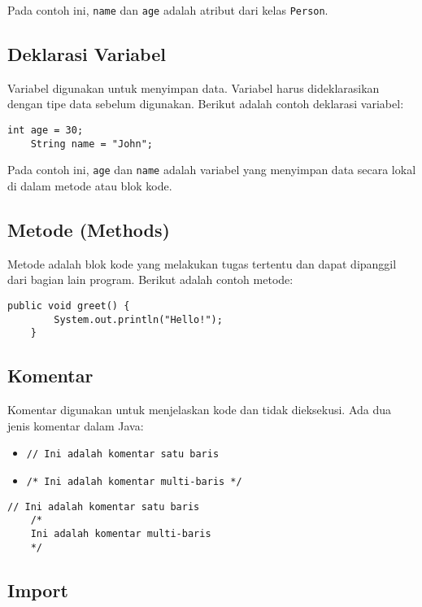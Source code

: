 Pada contoh ini, \texttt{name} dan \texttt{age} adalah atribut dari kelas \texttt{Person}.

\subsection{Deklarasi Variabel}
Variabel digunakan untuk menyimpan data. Variabel harus dideklarasikan dengan tipe data sebelum digunakan. Berikut adalah contoh deklarasi variabel:

\begin{lstlisting}[style=JavaStyle]
	int age = 30;
	String name = "John";
\end{lstlisting}

Pada contoh ini, \texttt{age} dan \texttt{name} adalah variabel yang menyimpan data secara lokal di dalam metode atau blok kode.


\subsection{Metode (Methods)}

Metode adalah blok kode yang melakukan tugas tertentu dan dapat dipanggil dari bagian lain program. Berikut adalah contoh metode:

\begin{lstlisting}[style=JavaStyle]
	public void greet() {
		System.out.println("Hello!");
	}
\end{lstlisting}

\subsection{Komentar}

Komentar digunakan untuk menjelaskan kode dan tidak dieksekusi. Ada dua jenis komentar dalam Java:

\begin{itemize}
	\item \texttt{// Ini adalah komentar satu baris}
	\item \texttt{/* Ini adalah komentar multi-baris */}
\end{itemize}

\begin{lstlisting}[style=JavaStyle]
	// Ini adalah komentar satu baris
	/*
	Ini adalah komentar multi-baris
	*/
\end{lstlisting}

\subsection{Import}

